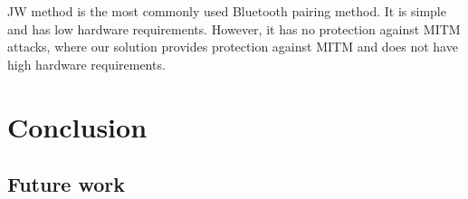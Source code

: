 \documentclass[12pt]{article}
\begin{document}
JW method is the most commonly used Bluetooth pairing method. It is simple and has low hardware requirements. However, it has no protection against MITM attacks, where our solution provides protection against MITM and does not have high hardware requirements.

\section{Conclusion}
\label{sec:Conclusion}
\subsection{Future work}
\label{sub:future work}

\newpage


\nocite{*}

\end{document}
